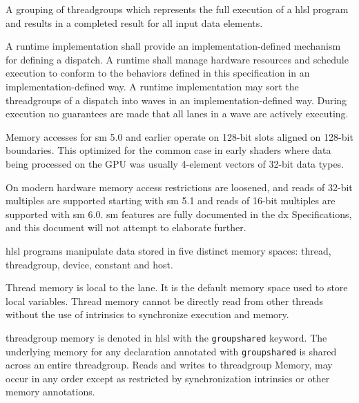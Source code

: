 
\p A grouping of \gls{threadgroup}s which represents the full execution of a
\acrshort{hlsl} program and results in a completed result for all input data
elements.


\p A runtime implementation shall provide an implementation-defined mechanism
for defining a \gls{dispatch}. A runtime shall manage hardware resources and
schedule execution to conform to the behaviors defined in this specification in
an implementation-defined way. A runtime implementation may sort the
\gls{threadgroup}s of a \gls{dispatch} into \gls{wave}s in an
implementation-defined way. During execution no guarantees are made that all
\gls{lane}s in a \gls{wave} are actively executing.


\p Memory accesses for \gls{sm} 5.0 and earlier operate on 128-bit slots aligned
on 128-bit boundaries. This optimized for the common case in early shaders where
data being processed on the GPU was usually 4-element vectors of 32-bit data
types.

\p On modern hardware memory access restrictions are loosened, and reads of
32-bit multiples are supported starting with \gls{sm} 5.1 and reads of 16-bit
multiples are supported with \gls{sm} 6.0. \gls{sm} features are fully
documented in the \gls{dx} Specifications, and this document will not attempt to
elaborate further.


\p \acrshort{hlsl} programs manipulate data stored in five distinct memory
spaces: thread, threadgroup, device, constant and host.


\p Thread memory is local to the \gls{lane}. It is the default memory space used to
store local variables. Thread memory cannot be directly read from other threads
without the use of intrinsics to synchronize execution and memory.


\p \gls{threadgroup} memory is denoted in \acrshort{hlsl} with the
\texttt{groupshared} keyword. The underlying memory for any declaration
annotated with \texttt{groupshared} is shared across an entire
\gls{threadgroup}. Reads and writes to \gls{threadgroup} Memory, may occur in
any order except as restricted by synchronization intrinsics or other memory
annotations.

